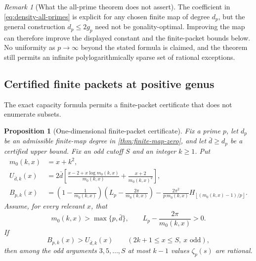 \documentclass[11pt]{article}
\newtheorem{proposition}[proposition]{Proposition}
\theoremstyle{definition}
\theoremstyle{remark}
\newtheorem{remark}[remark]{Remark}
\newcommand{\floor}[1]{\left\lfloor #1\right\rfloor}
\begin{document}
\begin{remark}[What the all-prime theorem does not assert]
The coefficient in \eqref{eq:density-all-primes} is explicit for any chosen
finite map of degree $d_p$, but the general construction
$d_p\le2g_p$ need not be gonality-optimal.  Improving the map can therefore
improve the displayed constant and the finite-packet bounds below.  No
uniformity as $p\to\infty$ beyond the stated formula is claimed, and the
theorem still permits an infinite polylogarithmically sparse set of rational
exceptions.
\end{remark}



\subsection{Certified finite packets at positive genus}
\label{sec:positive-genus-finite}

The exact capacity formula permits a finite-packet certificate that does not
enumerate subsets.

\begin{proposition}[One-dimensional finite-packet certificate]
\label{prop:finite-packet-certificate}
Fix a prime $p$, let $d_p$ be an admissible finite-map degree in
\cref{thm:finite-map-zero}, and let $\bar d\ge d_p$ be a certified upper
bound.  Fix an odd cutoff $S$ and an integer $k\ge1$.  Put
\begin{align}
 m_0(k,x)&=x+k^2,\label{eq:finite-cert-m0}\\
 U_{\bar d,k}(x)&=2\bar d\left[
 \frac{x-2+x\log m_0(k,x)}{m_0(k,x)}
 +\frac{x+2}{m_0(k,x)^2}\right],\label{eq:finite-cert-U}\\
 B_{p,k}(x)&=
 \left(1-\frac1{m_0(k,x)}\right)
 \left(L_p-\frac{2\pi}{m_0(k,x)}\right)
 -\frac{2\pi^2}{p\,m_0(k,x)}
 H_{\floor{(m_0(k,x)-1)/p}}.\label{eq:finite-cert-B}
\end{align}
Assume, for every relevant $x$, that
\[
 m_0(k,x)>\max\{p,\bar d\},
 \qquad L_p-\frac{2\pi}{m_0(k,x)}>0.
\]
If
\begin{equation}\label{eq:finite-cert-condition}
 B_{p,k}(x)>U_{\bar d,k}(x)
 \qquad(2k+1\le x\le S,\ x\text{ odd}),
\end{equation}
then among the odd arguments $3,5,\ldots,S$ at most $k-1$ values
$\zeta_p(s)$ are rational.
\end{proposition}
\end{document}
